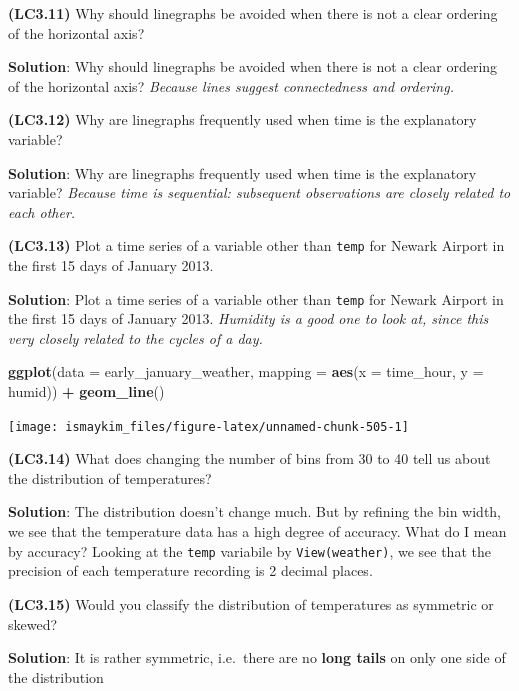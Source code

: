 \documentclass[12pt, krantz2,]{krantz}
\makeatletter
\newenvironment{Shaded}{\begin{snugshade}}{\end{snugshade}}
\newcommand{\DataTypeTok}[1]{\textcolor[rgb]{0.27,0.27,0.27}{#1}}
\newcommand{\KeywordTok}[1]{\textcolor[rgb]{0.27,0.27,0.27}{\textbf{#1}}}
\newcommand{\NormalTok}[1]{#1}
\newcommand{\OperatorTok}[1]{\textcolor[rgb]{0.43,0.43,0.43}{\textbf{#1}}}
\newcommand{\StringTok}[1]{\textcolor[rgb]{0.5,0.5,0.5}{#1}}
\newenvironment{kframe}{%
\medskip{}
\setlength{\fboxsep}{.8em}
 \def\at@end@of@kframe{}%
 \ifinner\ifhmode%
  \def\at@end@of@kframe{\end{minipage}}%
  \begin{minipage}{\columnwidth}%
 \fi\fi%
 \def\FrameCommand##1{\hskip\@totalleftmargin \hskip-\fboxsep
 \colorbox{shadecolor}{##1}\hskip-\fboxsep
     \hskip-\linewidth \hskip-\@totalleftmargin \hskip\columnwidth}%
 \MakeFramed {\advance\hsize-\width
   \@totalleftmargin\z@ \linewidth\hsize
   \@setminipage}}%
 {\par\unskip\endMakeFramed%
 \at@end@of@kframe}
\renewenvironment{Shaded}{\begin{kframe}}{\end{kframe}}
\makeatother
\begin{document}
\textbf{(LC3.11)} Why should linegraphs be avoided when there is not a clear ordering of the horizontal axis?

\textbf{Solution}: Why should linegraphs be avoided when there is not a clear ordering of the horizontal axis? \emph{Because lines suggest connectedness and ordering.}

\textbf{(LC3.12)} Why are linegraphs frequently used when time is the explanatory variable?

\textbf{Solution}: Why are linegraphs frequently used when time is the explanatory variable? \emph{Because time is sequential: subsequent observations are closely related to each other.}

\textbf{(LC3.13)} Plot a time series of a variable other than \texttt{temp} for Newark Airport in the first 15 days of January 2013.

\textbf{Solution}: Plot a time series of a variable other than \texttt{temp} for Newark Airport in the first 15 days of January 2013. \emph{Humidity is a good one to look at, since this very closely related to the cycles of a day.}

\begin{Shaded}
\begin{Highlighting}[]
\KeywordTok{ggplot}\NormalTok{(}\DataTypeTok{data =}\NormalTok{ early_january_weather, }\DataTypeTok{mapping =} \KeywordTok{aes}\NormalTok{(}\DataTypeTok{x =}\NormalTok{ time_hour, }\DataTypeTok{y =}\NormalTok{ humid)) }\OperatorTok{+}
\StringTok{  }\KeywordTok{geom_line}\NormalTok{()}
\end{Highlighting}
\end{Shaded}

\begin{center}\texttt{[image: ismaykim\_files/figure-latex/unnamed-chunk-505-1]} \end{center}

\textbf{(LC3.14)} What does changing the number of bins from 30 to 40 tell us about the distribution of temperatures?

\textbf{Solution}: The distribution doesn't change much. But by refining the bin width, we see that the temperature data has a high degree of accuracy. What do I mean by accuracy? Looking at the \texttt{temp} variabile by \texttt{View(weather)}, we see that the precision of each temperature recording is 2 decimal places.

\textbf{(LC3.15)} Would you classify the distribution of temperatures as symmetric or skewed?

\textbf{Solution}: It is rather symmetric, i.e.~there are no \textbf{long tails} on only one side of the distribution
\end{document}
